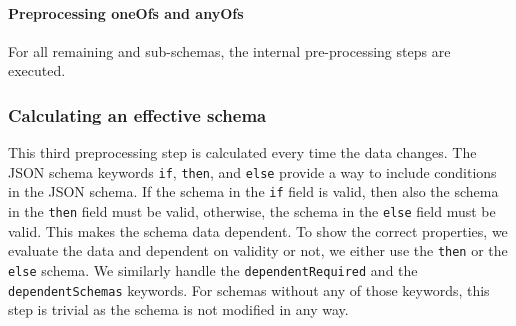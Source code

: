 \paragraph{Preprocessing oneOfs and anyOfs}
For all remaining  and  sub-schemas, the internal pre-processing steps are executed.


%
%
%
%
%

\subsubsection{Calculating an effective schema}

This third preprocessing step is calculated every time the data changes.
The JSON schema keywords \texttt{if}, \texttt{then}, and \texttt{else} provide a way to include conditions in the JSON schema.
If the schema in the \texttt{if} field is valid, then also the schema in the \texttt{then} field must be valid, otherwise, the
schema in the \texttt{else} field must be valid.
This makes the schema data dependent.
To show the correct properties, we evaluate the data and dependent on validity or not, we either use the \texttt{then} or the \texttt{else} schema.
We similarly handle the \texttt{dependentRequired} and the \texttt{dependentSchemas} keywords.
For schemas without any of those keywords, this step is trivial as the schema is not modified in any way.

